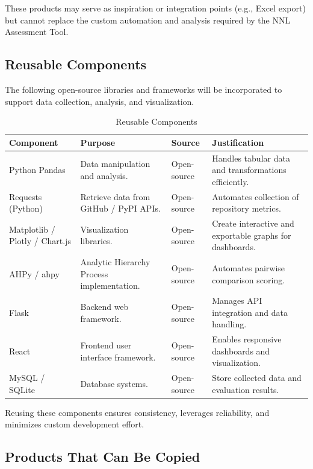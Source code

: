 \documentclass[12pt]{article}
\begin{document}
These products may serve as inspiration or integration points (e.g., Excel export) but cannot replace the custom automation and analysis required by the NNL Assessment Tool.

\subsection{Reusable Components}

The following open-source libraries and frameworks will be incorporated to support data collection, analysis, and visualization.

\begin{table}[H]
\centering
\caption{Reusable Components}
\setlength{\tabcolsep}{4pt}
\renewcommand{\arraystretch}{1.2}
\footnotesize

\begin{tabularx}{\textwidth}{p{2.7cm} Y Y Y}
\toprule
\textbf{Component} & \textbf{Purpose} & \textbf{Source} & \textbf{Justification} \\
\midrule
{}
Python Pandas &
Data manipulation and analysis. &
Open-source &
Handles tabular data and transformations efficiently. \\
\hline
Requests (Python) &
Retrieve data from GitHub / PyPI APIs. &
Open-source &
Automates collection of repository metrics. \\
\hline
Matplotlib / Plotly / Chart.js &
Visualization libraries. &
Open-source &
Create interactive and exportable graphs for dashboards. \\
\hline
AHPy / ahpy &
Analytic Hierarchy Process implementation. &
Open-source &
Automates pairwise comparison scoring. \\
\hline
Flask &
Backend web framework. &
Open-source &
Manages API integration and data handling. \\
\hline
React &
Frontend user interface framework. &
Open-source &
Enables responsive dashboards and visualization. \\
\hline
MySQL / SQLite &
Database systems. &
Open-source &
Store collected data and evaluation results. \\
\bottomrule
\end{tabularx}
\end{table}


Reusing these components ensures consistency, leverages reliability, and minimizes custom development effort.

\subsection{Products That Can Be Copied}
\end{document}
